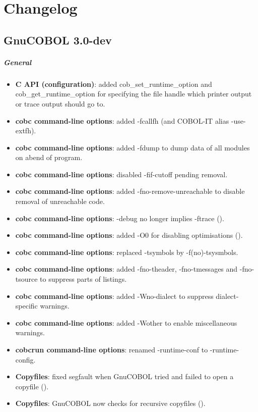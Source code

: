 \chapter{Changelog}

\section{GnuCOBOL 3.0-dev}

\paragraph{General}
\begin{itemize}
\item \textbf{C API (configuration)}: added cob\_set\_runtime\_option and cob\_get\_runtime\_option for specifying the file handle which printer output or trace output should go to.
\item \textbf{cobc command-line options}: added -fcallfh (and COBOL-IT alias -use-extfh).
\item \textbf{cobc command-line options}: added -fdump to dump data of all modules on abend of program.
\item \textbf{cobc command-line options}: disabled -fif-cutoff pending removal.
\item \textbf{cobc command-line options}: added -fno-remove-unreachable to disable removal of unreachable code.
\item \textbf{cobc command-line options}: -debug no longer implies -ftrace ().
\item \textbf{cobc command-line options}: added -O0 for disabling optimisations ().
\item \textbf{cobc command-line options}: replaced -tsymbols by -f(no)-tsysmbols.
\item \textbf{cobc command-line options}: added -fno-theader, -fno-tmessages and -fno-tsource to suppress parts of listings.
\item \textbf{cobc command-line options}: added -Wno-dialect to suppress dialect-specific warnings.
\item \textbf{cobc command-line options}: added -Wother to enable miscellaneous warnings.
\item \textbf{cobcrun command-line options}: renamed -runtime-conf to -runtime-config.
\item \textbf{Copyfiles}: fixed segfault when GnuCOBOL tried and failed to open a copyfile ().
\item \textbf{Copyfiles}: GnuCOBOL now checks for recursive copyfiles ().

\end{itemize}
